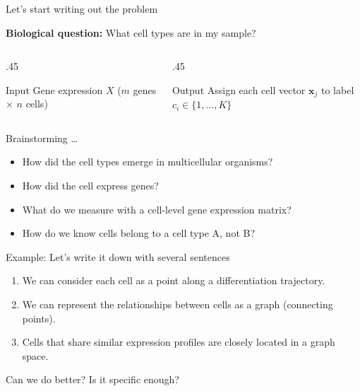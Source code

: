\documentclass[
  12pt,
  ignorenonframetext,
  aspectratio=169]{beamer}
\begin{document}
\begin{frame}{Let's start writing out the problem}
\protect{}\label{lets-start-writing-out-the-problem}
\Large

\textbf{Biological question:} What cell types are in my sample?

\normalsize

\vfill

\begin{columns}[T]
\begin{column}{.45\linewidth}
\begin{block}{Input}
\protect{}\label{input}
Gene expression \(X\) (\(m\) genes \(\times\) \(n\) cells)
\end{block}
\end{column}

\begin{column}{.45\linewidth}
\begin{block}{Output}
\protect{}\label{output}
Assign each cell vector \(\mathbf{x}_{j}\) to label
\(c_i \in \{1, \ldots, K\}\)
\end{block}
\end{column}
\end{columns}
\end{frame}

\begin{frame}{Brainstorming \ldots{}}
\protect{}\label{brainstorming}
\begin{itemize}
\item
  How did the cell types emerge in multicellular organisms?
\item
  How did the cell express genes?
\item
  What do we measure with a cell-level gene expression matrix?
\item
  How do we know cells belong to a cell type A, not B?
\end{itemize}
\end{frame}

\begin{frame}{Example: Let's write it down with several sentences}
\protect{}\label{example-lets-write-it-down-with-several-sentences}
\begin{enumerate}
\item
  We can consider each cell as a point along a differentiation
  trajectory.
\item
  We can represent the relationships between cells as a graph
  (connecting points).
\item
  Cells that share similar expression profiles are closely located in a
  graph space.
\end{enumerate}

\vfill

Can we do better? Is it specific enough?
\end{frame}
\end{document}
